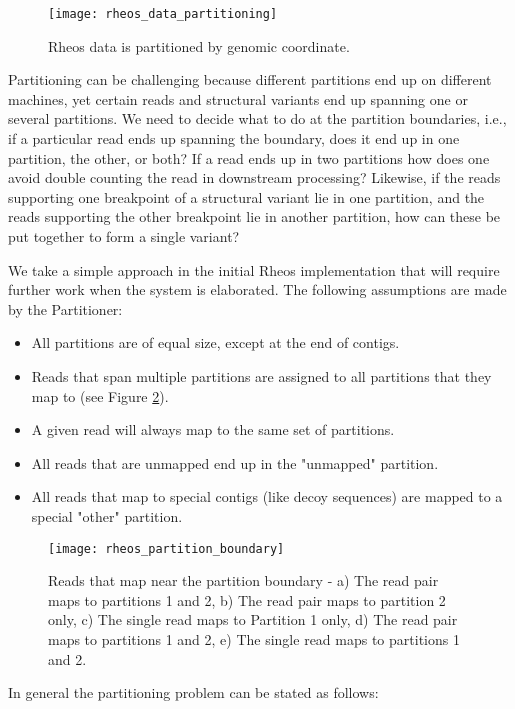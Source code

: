 \begin{figure}[H]
    \texttt{[image: rheos\_data\_partitioning]}
    \centering
    \caption {Rheos data is partitioned by genomic coordinate.}
    \label{fig:rheos_data_partitioning}
\end{figure}
\newpage
Partitioning can be challenging because different partitions end up on different machines, yet certain reads and structural variants end up spanning one or several partitions. We need to decide what to do at the partition boundaries, i.e., if a particular read ends up spanning the boundary, does it end up in one partition, the other, or both? If a read ends up in two partitions how does one avoid double counting the read in downstream processing? Likewise, if the reads supporting one breakpoint of a structural variant lie in one partition, and the reads supporting the other breakpoint lie in another partition, how can these be put together to form a single variant?

We take a simple approach in the initial Rheos implementation that will require further work when the system is elaborated. The following assumptions are made by the Partitioner:

\begin{itemize}
    \item All partitions are of equal size, except at the end of contigs.
    \item Reads that span multiple partitions are assigned to all partitions that they map to (see Figure \ref{fig:rheos_partition_boundary}).
    \item A given read will always map to the same set of partitions.
    \item All reads that are unmapped end up in the "unmapped" partition.
    \item All reads that map to special contigs (like decoy sequences) are mapped to a special "other" partition.
\end{itemize}

\begin{figure}[H]
    \texttt{[image: rheos\_partition\_boundary]}
    \centering
    \caption {Reads that map near the partition boundary - a) The read pair maps to partitions 1 and 2, b) The read pair maps to partition 2 only, c) The single read maps to Partition 1 only, d) The read pair maps to partitions 1 and 2, e) The single read maps to partitions 1 and 2.}
    \label{fig:rheos_partition_boundary}
\end{figure}
\newpage
In general the partitioning problem can be stated as follows:


